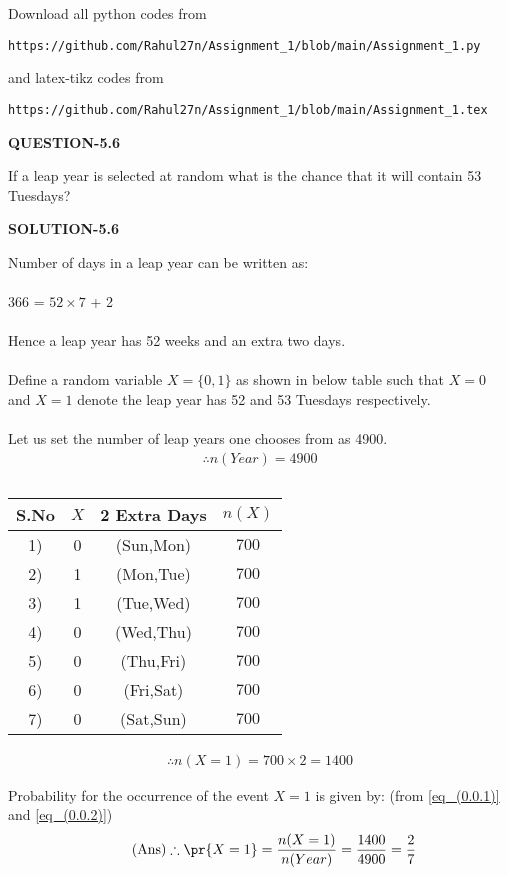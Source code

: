 \documentclass[journal,12pt,twocolumn]{IEEEtran}
\begin{document}
Download all python codes from 
\begin{lstlisting}
https://github.com/Rahul27n/Assignment_1/blob/main/Assignment_1.py
\end{lstlisting}
%
and latex-tikz codes from 
%
\begin{lstlisting}
https://github.com/Rahul27n/Assignment_1/blob/main/Assignment_1.tex
\end{lstlisting}

\vspace{0.5cm}
\textbf{QUESTION-5.6}
\vspace{0.5cm}

If a leap year is selected at random what is the chance that it will contain 53 Tuesdays?

\vspace{0.5cm}
\textbf{SOLUTION-5.6}
\vspace{0.5cm}

Number of days in a leap year can be written as:\\
\\366 = $52\times7$ + 2\\
\\Hence a leap year has 52 weeks and an extra two days.\\
\\Define a random variable $X=\{0,1\}$ as shown in below table such that $X=0$ and $X=1$ denote the leap year has 52 and 53 Tuesdays respectively.\\
\\Let us set the number of leap years one chooses from as 4900.
\begin{align}
    \tag{5.6.1}
    \therefore n(Year) = 4900 \label{eq_(0.0.1)}
\end{align}

\begin{table}[h]
\caption{}
\centering
\begin{tabular}{|c|c|c|c|}
\hline
S.No & $X$ & 2 Extra Days & $n(X)$\\
\hline
1)  & 0 & (Sun,Mon) & $700$\\
\hline
2) & 1 & (Mon,Tue) & $700$\\
\hline
3)  & 1 & (Tue,Wed)  & $700$\\
\hline      
4)  & 0 & (Wed,Thu) & $700$ \\
\hline
5) & 0 & (Thu,Fri)  & $700$ \\
\hline
6) & 0 & (Fri,Sat) & $700$\\
\hline
7) & 0 &  (Sat,Sun) & $700$\\
\hline
\end{tabular}
\label{table}
\end{table}

 \begin{align}
  \tag{5.6.2}
  \therefore  n(X=1) = 700\times2 = 1400 \label{eq_(0.0.2)}
\end{align}
 
Probability for the occurrence of the event $X=1$ is given by: (from \eqref{eq_(0.0.1)} and \eqref{eq_(0.0.2)})
\begin{align}
    \tag{Ans}
    \therefore 
     \pr{X=1} = \frac{n(X=1)}{n(Year)} = \frac{1400}{4900} = \frac{2}{7}
\end{align}
\end{document}
